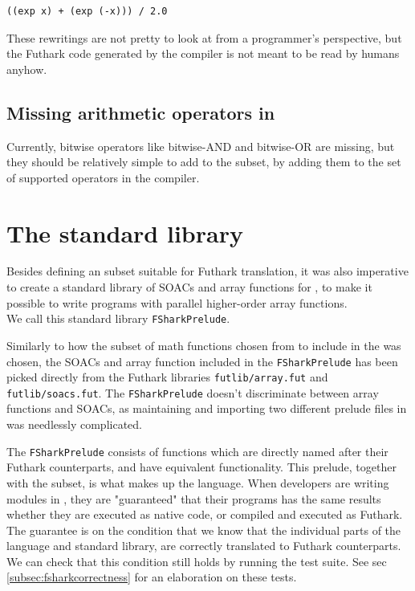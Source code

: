 \begin{lstlisting}[language=Futhark]
  ((exp x) + (exp (-x))) / 2.0
\end{lstlisting}

These rewritings are not pretty to look at from a programmer's perspective, but
the Futhark code generated by the \fshark{} compiler is not meant to be read by humans anyhow.

\subsection{Missing arithmetic operators in \fshark{}}
Currently, bitwise operators like bitwise-AND and bitwise-OR are missing, but
they should be relatively simple to add to the \fshark{} subset, by adding them
to the set of supported operators in the \fshark{} compiler.

\section{The \fshark{} standard library}
Besides defining an \fsharp{} subset suitable for Futhark translation, it was
also imperative to create a standard library of SOACs and array functions for \fshark{},
to make it possible to write programs with parallel higher-order array
functions.
\\
We call this standard library \texttt{FSharkPrelude}.

Similarly to how the subset of math functions chosen from \fsharp{} to include in
the \fshark{} was chosen, the SOACs and array function included in the
\texttt{FSharkPrelude} has been picked directly from the Futhark libraries
\texttt{futlib/array.fut} and \texttt{futlib/soacs.fut}. The \texttt{FSharkPrelude} doesn't
discriminate between array functions and SOACs, as maintaining and importing two
different prelude files in \fshark{} was needlessly complicated.

The \texttt{FSharkPrelude} consists of functions which are directly named after
their Futhark counterparts, and have equivalent functionality.
This prelude, together with the \fshark{} subset, is what makes up the \fshark{} language.
When \fshark{} developers are writing modules in \fshark{}, they are "guaranteed"
that their \fshark{} programs has the same results whether they are executed as
native \fsharp{} code, or compiled and executed as Futhark. 
The guarantee is on the condition that we know that the
individual parts of the \fshark{} language and standard library,  are correctly
translated to Futhark counterparts.
We can check that this condition still holds by running the \fshark{} test
suite. See sec \ref{subsec:fsharkcorrectness} for an elaboration on these tests.


